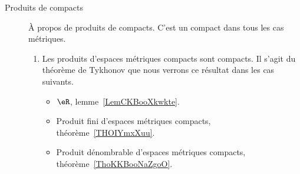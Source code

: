 \begin{description}
        \item[Produits de compacts]
            À propos de produits de compacts. C'est un compact dans tous les cas métriques.
    \begin{enumerate}
    \item
        Les produits d'espaces métriques compacts sont compacts. Il s'agit du théorème de Tykhonov que nous verrons ce résultat dans les cas suivants.
        \begin{itemize}
    \item
         \( \eR\), lemme~\ref{LemCKBooXkwkte}.
    \item
        Produit fini d'espaces métriques compacts, théorème~\ref{THOIYmxXuu}.
    \item
        Produit dénombrable d'espaces métriques compacts, théorème~\ref{ThoKKBooNaZgoO}.
        \end{itemize}
    \end{enumerate}
    \end{description}

